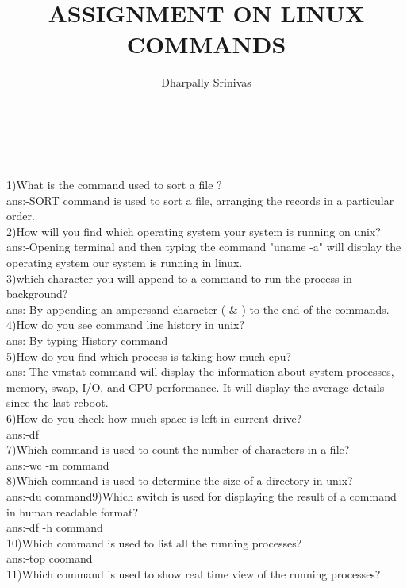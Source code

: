 \documentclass{article}
\author{Dharpally Srinivas}
\begin{document}
\title{ASSIGNMENT ON LINUX COMMANDS}

\maketitle
\\


\Large{
\\1)What is the command used to sort a file ?\\
ans:-SORT command is used to sort a file, arranging the records in a particular order.\\
2)How will you find which operating system your system is running on unix?\\
ans:-Opening terminal and then typing the command "uname -a" will display the operating system
our system is running in linux.\\
3)which character you will append to a command to run the process in background?\\
ans:-By appending an ampersand character ( & ) to the end of the commands.\\
4)How do you see command line history in unix?\\
ans:-By typing History command\\
5)How do you find which process is taking how much cpu?\\
ans:-The vmstat command will display the information about system processes, memory, swap, I/O,
and CPU performance. It will display the average details since the last reboot.\\
6)How do you check how much space is left in current drive?\\
ans:-df\\
7)Which command is used to count the number of characters in a file?\\
ans:-wc -m command\\
8)Which command is used to determine the size of a directory in unix?\\
ans:-du command9)Which switch is used for displaying the result of a command in human readable format?\\
ans:-df -h command\\
10)Which command is used to list all the running processes?\\
ans:-top coomand\\
11)Which command is used to show real time view of the running processes?\\
}
\end{document}
